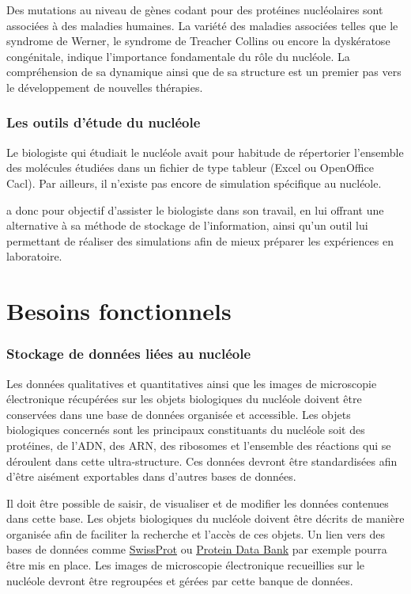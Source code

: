 Des mutations au niveau de gènes codant pour des protéines
nucléolaires sont associées à des maladies humaines. La variété des
maladies associées telles que le syndrome de Werner, le syndrome de
Treacher Collins ou encore la dyskératose congénitale, indique
l'importance fondamentale du rôle du nucléole. La compréhension de sa
dynamique ainsi que de sa structure est un premier pas vers le
développement de nouvelles thérapies.

\subsubsection{Les outils d'étude du nucléole}

Le biologiste qui étudiait le nucléole avait pour habitude de
répertorier l'ensemble des molécules étudiées dans un fichier de type
tableur (Excel ou OpenOffice Cacl). Par ailleurs, il n'existe pas
encore de simulation  spécifique au nucléole.

\NQ a donc pour objectif d'assister le biologiste dans son travail, en
lui offrant une alternative à sa méthode de stockage de
l'information, ainsi qu'un outil lui permettant de réaliser des
simulations afin de mieux préparer les expériences en laboratoire.


\section{Besoins fonctionnels}

\subsubsection{Stockage de données liées au nucléole}
Les données qualitatives et quantitatives ainsi que les images de
microscopie électronique récupérées sur les objets biologiques du
nucléole doivent être conservées dans une base de données organisée et
accessible. Les objets biologiques concernés sont les principaux
constituants du nucléole soit des protéines, de l'ADN, des ARN, des
ribosomes et l'ensemble des réactions qui se déroulent dans cette
ultra-structure. Ces données devront être standardisées afin d'être
aisément exportables dans d'autres bases de données.

Il doit être possible de saisir, de visualiser et de modifier les
données contenues dans cette base. Les objets biologiques du nucléole
doivent être décrits de manière organisée afin de faciliter la
recherche et l'accès de ces objets. Un lien vers des bases de données
comme \href{http://expasy.org/sprot}{SwissProt} ou
\href{http://www.pdb.org/}{Protein Data Bank} par exemple pourra être
mis en place. Les images de microscopie électronique recueillies sur
le nucléole devront être regroupées et gérées par cette banque de
données.

